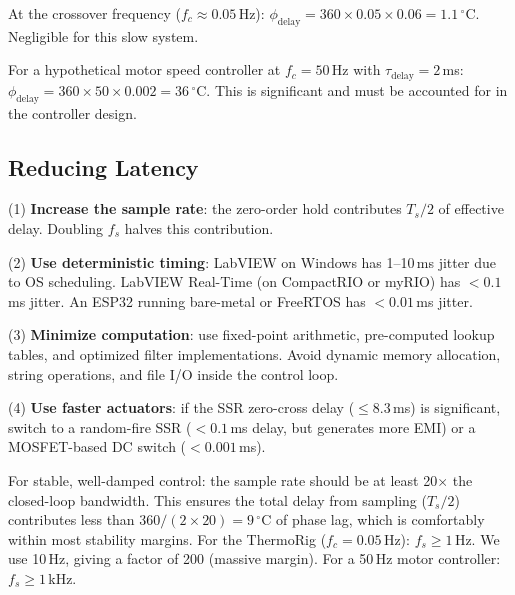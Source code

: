 \documentclass[11pt,letterpaper,twoside,openany]{book}
\newcommand{\degC}{\ensuremath{{}^{\circ}\text{C}}}
\begin{document}
At the crossover frequency ($f_c \approx 0.05$\,Hz): $\phi_{\text{delay}} = 360 \times 0.05 \times 0.06 = 1.1$\,\degC{}. Negligible for this slow system.

For a hypothetical motor speed controller at $f_c = 50$\,Hz with $\tau_{\text{delay}} = 2$\,ms: $\phi_{\text{delay}} = 360 \times 50 \times 0.002 = 36$\,\degC{}. This is significant and must be accounted for in the controller design.

\subsection{Reducing Latency}
(1) \textbf{Increase the sample rate}: the zero-order hold contributes $T_s/2$ of effective delay. Doubling $f_s$ halves this contribution.

(2) \textbf{Use deterministic timing}: LabVIEW on Windows has 1--10\,ms jitter due to OS scheduling. LabVIEW Real-Time (on CompactRIO or myRIO) has $< 0.1$\,ms jitter. An ESP32 running bare-metal or FreeRTOS has $< 0.01$\,ms jitter.

(3) \textbf{Minimize computation}: use fixed-point arithmetic, pre-computed lookup tables, and optimized filter implementations. Avoid dynamic memory allocation, string operations, and file I/O inside the control loop.

(4) \textbf{Use faster actuators}: if the SSR zero-cross delay ($\leq 8.3$\,ms) is significant, switch to a random-fire SSR ($< 0.1$\,ms delay, but generates more EMI) or a MOSFET-based DC switch ($< 0.001$\,ms).

\begin{tipbox}
For stable, well-damped control: the sample rate should be at least 20$\times$ the closed-loop bandwidth. This ensures the total delay from sampling ($T_s/2$) contributes less than $360/(2 \times 20) = 9$\,\degC{} of phase lag, which is comfortably within most stability margins. For the ThermoRig ($f_c = 0.05$\,Hz): $f_s \geq 1$\,Hz. We use 10\,Hz, giving a factor of 200 (massive margin). For a 50\,Hz motor controller: $f_s \geq 1$\,kHz.
\end{tipbox}
\end{document}
